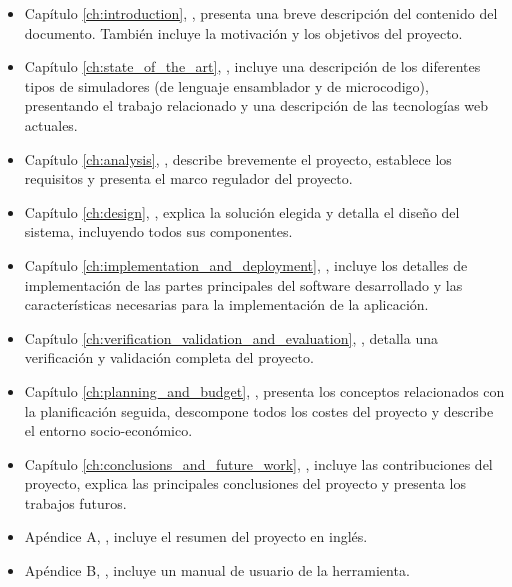 \begin{itemize}

\item Capítulo \ref{ch:introduction}, \textit{}, presenta una breve descripción del contenido del documento. También incluye la motivación y los objetivos del proyecto.

\item Capítulo \ref{ch:state_of_the_art}, \textit{}, incluye una descripción de los diferentes tipos de simuladores (de lenguaje ensamblador y de \gls{microcodigo}), presentando el trabajo relacionado y una descripción de las tecnologías web actuales.

\item Capítulo \ref{ch:analysis}, \textit{}, describe brevemente el proyecto, establece los requisitos y presenta el marco regulador del proyecto.

\item Capítulo \ref{ch:design}, \textit{}, explica la solución elegida y detalla el diseño del sistema, incluyendo todos sus componentes.

\item Capítulo \ref{ch:implementation_and_deployment}, \textit{}, incluye los detalles de implementación de las partes principales del software desarrollado y las características necesarias para la implementación de la aplicación.

\item Capítulo \ref{ch:verification_validation_and_evaluation}, \textit{}, detalla una verificación y validación completa del proyecto.

\item Capítulo \ref{ch:planning_and_budget}, \textit{}, presenta los conceptos relacionados con la planificación seguida, descompone todos los costes del proyecto y describe el entorno socio-económico.

\item Capítulo \ref{ch:conclusions_and_future_work}, \textit{}, incluye las contribuciones del proyecto, explica las principales conclusiones del proyecto y presenta los trabajos futuros.

\item Apéndice A, \textit{}, incluye el resumen del proyecto en inglés.

\item Apéndice B, \textit{}, incluye un manual de usuario de la herramienta.

\label{ch:apendicea}

\end{itemize}

